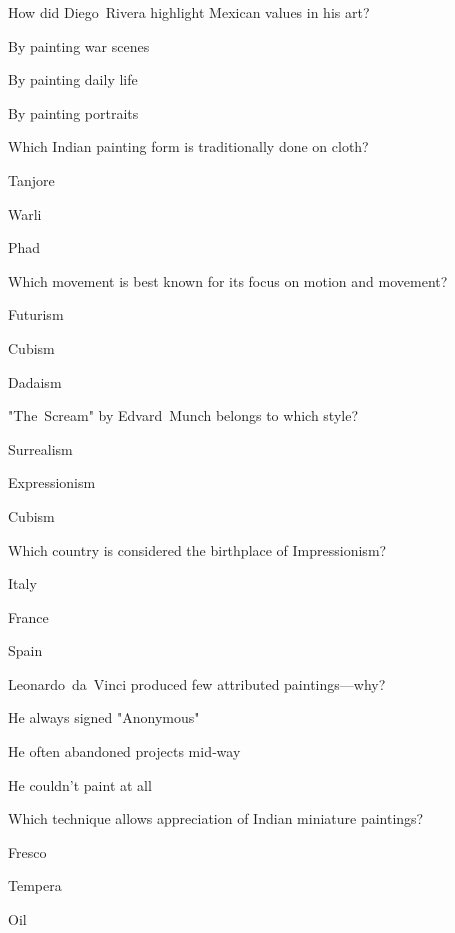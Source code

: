 \begin{enhancedmcq}{How did Diego Rivera highlight Mexican values in his art?}
\item By painting war scenes
\item By painting daily life
\item By painting portraits

\end{enhancedmcq}
\begin{enhancedmcq}{Which Indian painting form is traditionally done on cloth?}
\item Tanjore
\item Warli
\item Phad

\end{enhancedmcq}
\begin{enhancedmcq}{Which movement is best known for its focus on motion and movement?}
\item Futurism
\item Cubism
\item Dadaism

\end{enhancedmcq}
\begin{enhancedmcq}{"The Scream" by Edvard Munch belongs to which style?}
\item Surrealism
\item Expressionism
\item Cubism

\end{enhancedmcq}
\begin{enhancedmcq}{Which country is considered the birthplace of Impressionism?}
\item Italy
\item France
\item Spain

\end{enhancedmcq}
\begin{enhancedmcq}{Leonardo da Vinci produced few attributed paintings—why?}
\item He always signed "Anonymous"
\item He often abandoned projects mid‑way
\item He couldn't paint at all

\end{enhancedmcq}
\begin{enhancedmcq}{Which technique allows appreciation of Indian miniature paintings?}
\item Fresco
\item Tempera
\item Oil

\end{enhancedmcq}
